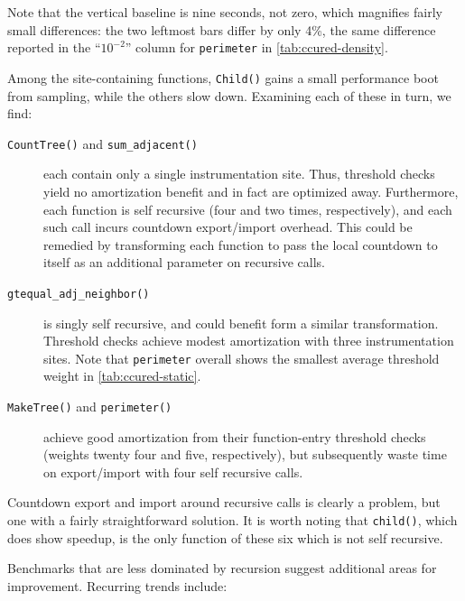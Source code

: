 Note that the vertical baseline is nine seconds, not zero, which
magnifies fairly small differences: the two leftmost bars differ by
only 4\%, the same difference reported in the ``$10^{-2}$'' column for
\texttt{perimeter} in \autoref{tab:ccured-density}.

Among the site-containing functions, \texttt{Child()} gains a small
performance boot from sampling, while the others slow down.  Examining
each of these in turn, we find:

\begin{description}
\item[\texttt{CountTree()} and \texttt{sum\_adjacent()}] each contain
  only a single instrumentation site.  Thus, threshold checks yield no
  amortization benefit and in fact are optimized away.  Furthermore,
  each function is self recursive (four and two times, respectively),
  and each such call incurs countdown export/import overhead.  This
  could be remedied by transforming each function to pass the local
  countdown to itself as an additional parameter on recursive calls.
  
\item[\texttt{gtequal\_adj\_neighbor()}] is singly self recursive, and
  could benefit form a similar transformation.  Threshold checks
  achieve modest amortization with three instrumentation sites.  Note
  that \texttt{perimeter} overall shows the smallest average threshold
  weight in \autoref{tab:ccured-static}.
  
\item[\texttt{MakeTree()} and \texttt{perimeter()}] achieve good
  amortization from their function-entry threshold checks (weights
  twenty four and five, respectively), but subsequently waste time on
  export/import with four self recursive calls.
\end{description}

Countdown export and import around recursive calls is clearly a
problem, but one with a fairly straightforward solution.  It is worth
noting that \texttt{child()}, which does show speedup, is the only
function of these six which is not self recursive.

Benchmarks that are less dominated by recursion suggest additional
areas for improvement.  Recurring trends include:

